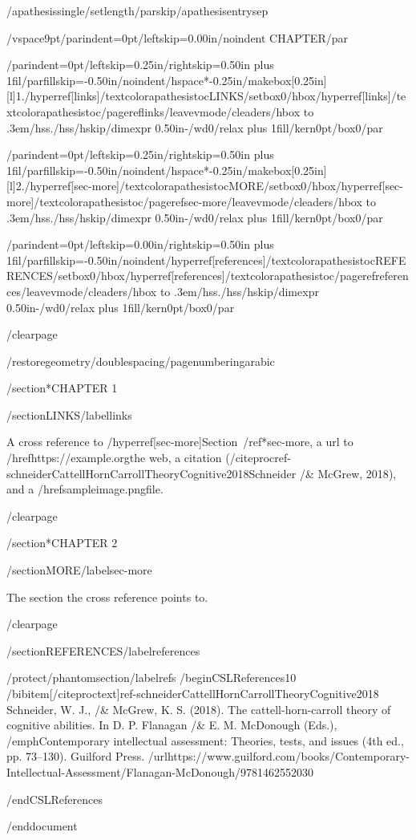 {/apathesissingle/setlength{/parskip}{/apathesisentrysep}

/vspace{9pt}{/parindent=0pt/leftskip=0.00in/noindent CHAPTER/par}

{/parindent=0pt/leftskip=0.25in/rightskip=0.50in plus 1fil/parfillskip=-0.50in/noindent/hspace*{-0.25in}/makebox[0.25in][l]{1.}/hyperref[links]{/textcolor{apathesistoc}{LINKS}}/setbox0/hbox{/hyperref[links]{/textcolor{apathesistoc}{/pageref{links}}}}/leavevmode/cleaders/hbox to .3em{/hss./hss}/hskip/dimexpr 0.50in-/wd0/relax plus 1fill/kern0pt/box0/par}

{/parindent=0pt/leftskip=0.25in/rightskip=0.50in plus 1fil/parfillskip=-0.50in/noindent/hspace*{-0.25in}/makebox[0.25in][l]{2.}/hyperref[sec-more]{/textcolor{apathesistoc}{MORE}}/setbox0/hbox{/hyperref[sec-more]{/textcolor{apathesistoc}{/pageref{sec-more}}}}/leavevmode/cleaders/hbox to .3em{/hss./hss}/hskip/dimexpr 0.50in-/wd0/relax plus 1fill/kern0pt/box0/par}

{/parindent=0pt/leftskip=0.00in/rightskip=0.50in plus 1fil/parfillskip=-0.50in/noindent/hyperref[references]{/textcolor{apathesistoc}{REFERENCES}}/setbox0/hbox{/hyperref[references]{/textcolor{apathesistoc}{/pageref{references}}}}/leavevmode/cleaders/hbox to .3em{/hss./hss}/hskip/dimexpr 0.50in-/wd0/relax plus 1fill/kern0pt/box0/par}

}

/clearpage

/restoregeometry/doublespacing/pagenumbering{arabic}

/section*{CHAPTER 1}

/section{LINKS}/label{links}

A cross reference to /hyperref[sec-more]{Section~/ref*{sec-more}}, a url
to /href{https://example.org}{the web}, a citation
(/citeproc{ref-schneiderCattellHornCarrollTheoryCognitive2018}{Schneider
/& McGrew, 2018}), and a /href{sampleimage.png}{file}.

/clearpage

/section*{CHAPTER 2}

/section{MORE}/label{sec-more}

The section the cross reference points to.

/clearpage

/section{REFERENCES}/label{references}

/protect/phantomsection/label{refs}
/begin{CSLReferences}{1}{0}
/bibitem[/citeproctext]{ref-schneiderCattellHornCarrollTheoryCognitive2018}
Schneider, W. J., /& McGrew, K. S. (2018). The cattell-horn-carroll
theory of cognitive abilities. In D. P. Flanagan /& E. M. McDonough
(Eds.), /emph{Contemporary intellectual assessment: Theories, tests, and
issues} (4th ed., pp. 73--130). Guilford Press.
/url{https://www.guilford.com/books/Contemporary-Intellectual-Assessment/Flanagan-McDonough/9781462552030}

/end{CSLReferences}




/end{document}
